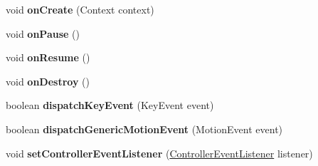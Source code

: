 \begin{DoxyCompactItemize}
void {\bfseries on\+Create} (Context context)
\item 
\mbox{\label{interfaceorg_1_1cocos2dx_1_1lib_1_1GameControllerDelegate_a999d2b0f4db72f0031de1bab925ef3e5}} 
void {\bfseries on\+Pause} ()
\item 
\mbox{\label{interfaceorg_1_1cocos2dx_1_1lib_1_1GameControllerDelegate_ad304c5401ab5e3b2d145f0293e9a2240}} 
void {\bfseries on\+Resume} ()
\item 
\mbox{\label{interfaceorg_1_1cocos2dx_1_1lib_1_1GameControllerDelegate_a60ac0005faad8bab695801f6d02f6cfb}} 
void {\bfseries on\+Destroy} ()
\item 
\mbox{\label{interfaceorg_1_1cocos2dx_1_1lib_1_1GameControllerDelegate_a80e2023df5a221191efbbaf2cb9fd2f0}} 
boolean {\bfseries dispatch\+Key\+Event} (Key\+Event event)
\item 
\mbox{\label{interfaceorg_1_1cocos2dx_1_1lib_1_1GameControllerDelegate_aca5e5a7b143fe5ad3fd967ad0d157eac}} 
boolean {\bfseries dispatch\+Generic\+Motion\+Event} (Motion\+Event event)
\item 
\mbox{\label{interfaceorg_1_1cocos2dx_1_1lib_1_1GameControllerDelegate_aa38b01e0877dc854360f0bac5b540e68}} 
void {\bfseries set\+Controller\+Event\+Listener} (\hyperlink{interfaceorg_1_1cocos2dx_1_1lib_1_1GameControllerDelegate_1_1ControllerEventListener}{Controller\+Event\+Listener} listener)
\end{DoxyCompactItemize}
